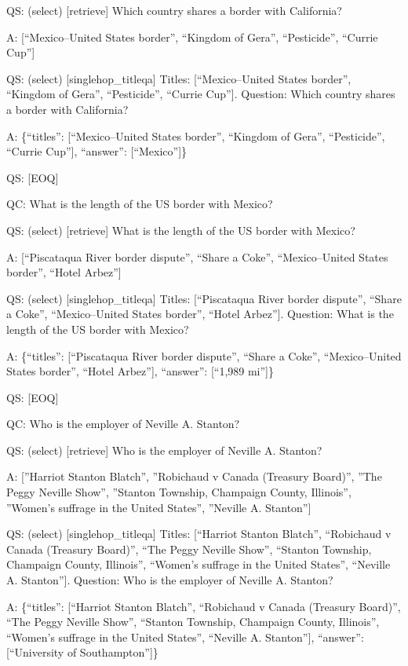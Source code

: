 \documentclass[
]{article}
\begin{document}
QS: (select) {[}retrieve{]} Which country shares a border with
California?

A: {[}``Mexico--United States border'', ``Kingdom of Gera'',
``Pesticide'', ``Currie Cup''{]}

QS: (select) {[}singlehop\_titleqa{]} Titles: {[}``Mexico--United States
border'', ``Kingdom of Gera'', ``Pesticide'', ``Currie Cup''{]}.
Question: Which country shares a border with California?

A: \{``titles'': {[}``Mexico--United States border'', ``Kingdom of
Gera'', ``Pesticide'', ``Currie Cup''{]}, ``answer'': {[}``Mexico''{]}\}

QS: {[}EOQ{]}

QC: What is the length of the US border with Mexico?

QS: (select) {[}retrieve{]} What is the length of the US border with
Mexico?

A: {[}``Piscataqua River border dispute'', ``Share a Coke'',
``Mexico--United States border'', ``Hotel Arbez''{]}

QS: (select) {[}singlehop\_titleqa{]} Titles: {[}``Piscataqua River
border dispute'', ``Share a Coke'', ``Mexico--United States border'',
``Hotel Arbez''{]}. Question: What is the length of the US border with
Mexico?

A: \{``titles'': {[}``Piscataqua River border dispute'', ``Share a
Coke'', ``Mexico--United States border'', ``Hotel Arbez''{]},
``answer'': {[}``1,989 mi''{]}\}

QS: {[}EOQ{]}

QC: Who is the employer of Neville A. Stanton?

QS: (select) {[}retrieve{]} Who is the employer of Neville A. Stanton?

A: {[}''Harriot Stanton Blatch'', ''Robichaud v Canada (Treasury
Board)'', ''The Peggy Neville Show'', ''Stanton Township, Champaign
County, Illinois'', ''Women's suffrage in the United States'', ''Neville
A. Stanton''{]}

QS: (select) {[}singlehop\_titleqa{]} Titles: {[}``Harriot Stanton
Blatch'', ``Robichaud v Canada (Treasury Board)'', ``The Peggy Neville
Show'', ``Stanton Township, Champaign County, Illinois'', ``Women's
suffrage in the United States'', ``Neville A. Stanton''{]}. Question:
Who is the employer of Neville A. Stanton?

A: \{``titles'': {[}``Harriot Stanton Blatch'', ``Robichaud v Canada
(Treasury Board)'', ``The Peggy Neville Show'', ``Stanton Township,
Champaign County, Illinois'', ``Women's suffrage in the United States'',
``Neville A. Stanton''{]}, ``answer'': {[}``University of
Southampton''{]}\}
\end{document}
